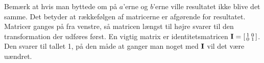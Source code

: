 Bemærk at hvis man byttede om på $a$'erne og $b$'erne ville resultatet ikke blive det samme. Det betyder at rækkefølgen af matricerne er afgørende for resultatet. Matricer ganges på fra venstre, så matricen længst til højre svarer til den transformation der udføres først.
En vigtig matrix er identitetsmatricen $\mathbf{I}= \begin{bsmallmatrix}1 & 0\\0& 1\end{bsmallmatrix}$. Den svarer til tallet 1, på den måde at ganger man noget med $\mathbf{I}$ vil det være uændret. 






